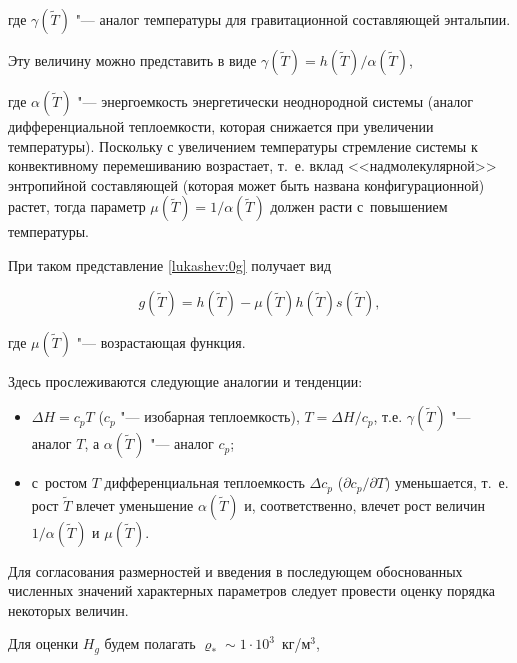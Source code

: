 где $\gamma(\widetilde{T})$ "--- аналог температуры для гравитационной составляющей энтальпии.

Эту величину можно представить в виде $\gamma(\widetilde{T})=h(\widetilde{T})/\alpha(\widetilde{T})$, 

где $\alpha(\widetilde{T})$ "--- энергоемкость энергетически неоднородной системы (аналог дифференциальной теплоемкости, которая снижается при увеличении температуры). Поскольку с увеличением температуры стремление системы к конвективному перемешиванию возрастает, т.~е. вклад <<надмолекулярной>> энтропийной составляющей (которая может быть названа конфигурационной) растет, тогда параметр $\mu(\widetilde{T})=1/\alpha(\widetilde{T})$ должен расти с~повышением температуры. 

При таком представление \eqref{lukashev:0g} получает вид

\begin{equation}

g(\widetilde{T})=h(\widetilde{T})-\mu(\widetilde{T}) h(\widetilde{T}) s(\widetilde{T}),\label{lukashev:00g}

\end{equation}

где  $\mu(\widetilde{T})$ "--- возрастающая функция.



Здесь прослеживаются следующие  аналогии и тенденции: 

\begin{itemize}

\item[--] $\Delta H=c_p T$ ($c_p$ "--- изобарная теплоемкость), $T=\Delta H/c_p$,  т.е. $\gamma(\widetilde{T})$ "--- аналог $T$, а $\alpha(\widetilde{T})$ "--- аналог $c_p$; 

\item[--] с~ростом $T$ дифференциальная теплоемкость  $\Delta c_p$ (${\partial}c_p/{\partial}T$) уменьшается, т.~е. рост  $\widetilde{T}$ влечет уменьшение $\alpha(\widetilde{T})$ и, соответственно, влечет  рост величин $1/\alpha(\widetilde{T})$ и  $\mu(\widetilde{T})$.

\end{itemize}



Для согласования размерностей и введения в последующем обоснованных численных значений характерных параметров следует провести оценку порядка  некоторых величин.

Для оценки  $H_g$ будем полагать $\varrho_*\sim 1\cdot 10^3$~кг/м$^3$, 

